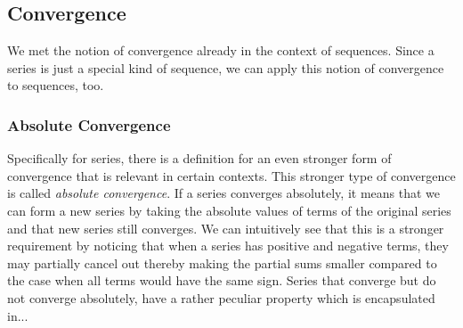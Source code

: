 








\subsection{Convergence}
We met the notion of convergence already in the context of sequences. Since a series is just a special kind of sequence, we can apply this notion of convergence to sequences, too. 


\subsubsection{Absolute Convergence}
Specifically for series, there is a definition for an even stronger form of convergence that is relevant in certain contexts. This stronger type of convergence is called \emph{absolute convergence}. If a series converges absolutely, it means that we can form a new series by taking the absolute values of terms of the original series and that new series still converges. We can intuitively see that this is a stronger requirement by noticing that when a series has positive and negative terms, they may partially cancel out thereby making the partial sums smaller compared to the case when all terms would have the same sign. Series that converge but do not converge absolutely, have a rather peculiar property which is encapsulated in...


